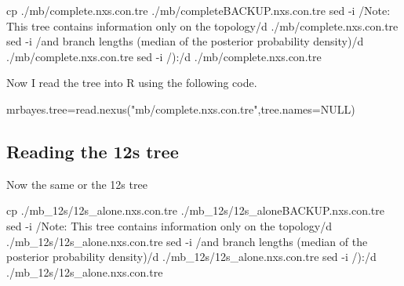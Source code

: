 \documentclass[
]{article}
\newenvironment{Shaded}{\begin{snugshade}}{\end{snugshade}}
\newcommand{\AttributeTok}[1]{\textcolor[rgb]{0.77,0.63,0.00}{#1}}
\newcommand{\ConstantTok}[1]{\textcolor[rgb]{0.00,0.00,0.00}{#1}}
\newcommand{\FunctionTok}[1]{\textcolor[rgb]{0.00,0.00,0.00}{#1}}
\newcommand{\NormalTok}[1]{#1}
\newcommand{\OtherTok}[1]{\textcolor[rgb]{0.56,0.35,0.01}{#1}}
\newcommand{\StringTok}[1]{\textcolor[rgb]{0.31,0.60,0.02}{#1}}
\begin{document}
\begin{Shaded}
\begin{Highlighting}[]
\FunctionTok{cp}\NormalTok{ ./mb/complete.nxs.con.tre ./mb/completeBACKUP.nxs.con.tre}
\FunctionTok{sed} \AttributeTok{{-}i} \StringTok{\textquotesingle{}/Note: This tree contains information only on the topology/d\textquotesingle{}}\NormalTok{ ./mb/complete.nxs.con.tre}
\FunctionTok{sed} \AttributeTok{{-}i} \StringTok{\textquotesingle{}/and branch lengths (median of the posterior probability density)/d\textquotesingle{}}\NormalTok{ ./mb/complete.nxs.con.tre}
\FunctionTok{sed} \AttributeTok{{-}i} \StringTok{\textquotesingle{}/):/d\textquotesingle{}}\NormalTok{ ./mb/complete.nxs.con.tre}
\end{Highlighting}
\end{Shaded}

Now I read the tree into R using the following code.

\begin{Shaded}
\begin{Highlighting}[]
\NormalTok{mrbayes.tree}\OtherTok{=}\FunctionTok{read.nexus}\NormalTok{(}\StringTok{"mb/complete.nxs.con.tre"}\NormalTok{,}\AttributeTok{tree.names=}\ConstantTok{NULL}\NormalTok{)}
\end{Highlighting}
\end{Shaded}

\hypertarget{reading-the-12s-tree}{%
\subsection{Reading the 12s tree}\label{reading-the-12s-tree}}

Now the same or the 12s tree

\begin{Shaded}
\begin{Highlighting}[]
\FunctionTok{cp}\NormalTok{ ./mb\_12s/12s\_alone.nxs.con.tre ./mb\_12s/12s\_aloneBACKUP.nxs.con.tre}
\FunctionTok{sed} \AttributeTok{{-}i} \StringTok{\textquotesingle{}/Note: This tree contains information only on the topology/d\textquotesingle{}}\NormalTok{ ./mb\_12s/12s\_alone.nxs.con.tre}
\FunctionTok{sed} \AttributeTok{{-}i} \StringTok{\textquotesingle{}/and branch lengths (median of the posterior probability density)/d\textquotesingle{}}\NormalTok{ ./mb\_12s/12s\_alone.nxs.con.tre}
\FunctionTok{sed} \AttributeTok{{-}i} \StringTok{\textquotesingle{}/):/d\textquotesingle{}}\NormalTok{ ./mb\_12s/12s\_alone.nxs.con.tre}
\end{Highlighting}
\end{Shaded}
\end{document}
